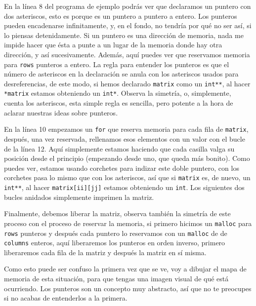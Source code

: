 \documentclass[a4paper]{article}
\begin{document}
En la línea 8 del programa de ejemplo podrás ver que declaramos un puntero
con dos asteriscos, esto es porque es un puntero a puntero a entero. Los
punteros pueden encadenarse infinitamente, y, en el fondo, no tendría por qué no
ser así, si lo piensas detenidamente. Si un puntero es una dirección de memoria,
nada me impide hacer que ésta a punte a un lugar de la memoria donde hay otra
dirección, y así sucesivamente. Además, aquí puedes ver que reservamos
memoria para \verb!rows! punteros a entero. La regla para entender los punteros
es que el número de asteriscos en la declaración se anula con los asteriscos
usados para desreferencias, de este modo, si hemos declarado \verb!matrix! como
un \verb!int**!, al hacer \verb!*matrix! estamos obteniendo un \verb!int*!.
Observa la simetría, o, simplemente, cuenta los asteriscos, esta simple regla
es sencilla, pero potente a la hora de aclarar nuestras ideas sobre punteros.

En la línea 10 empezamos un \verb!for! que reserva memoria para cada fila de
\verb!matrix!, después, una vez reservada, rellenamos esos elementos con un
valor con el bucle de la línea 12. Aquí simplemente estamos haciendo que cada
casilla valga su posición desde el principio (empezando desde uno, que queda más
bonito). Como puedes ver, estamos usando corchetes para indizar este doble
puntero, con los corchetes pasa lo mismo que con los asteriscos, así que si
\verb!matrix! es, de nuevo, un \verb!int**!, al hacer \verb!matrix[ii][jj]!
estamos obteniendo un \verb!int!. Los siguientes dos bucles anidados simplemente
imprimen la matriz.

Finalmente, debemos liberar la matriz, observa también la simetría de este
proceso con el proceso de reservar la memoria, si primero hicimos un
\verb!malloc! para \verb!rows! punteros y después cada puntero lo reservamos
con un \verb!malloc! de de \verb!columns! enteros, aquí liberaremos los punteros
en orden inverso, primero liberaremos cada fila de la matriz y después la
matriz en sí misma.

Como esto puede ser confuso la primera vez que se ve, voy a dibujar el mapa
de memoria de esta situación, para que tengas una imagen visual de qué está
ocurriendo. Los punteros son un concepto muy abstracto, así que no te preocupes
si no acabas de entenderlos a la primera.
\end{document}
